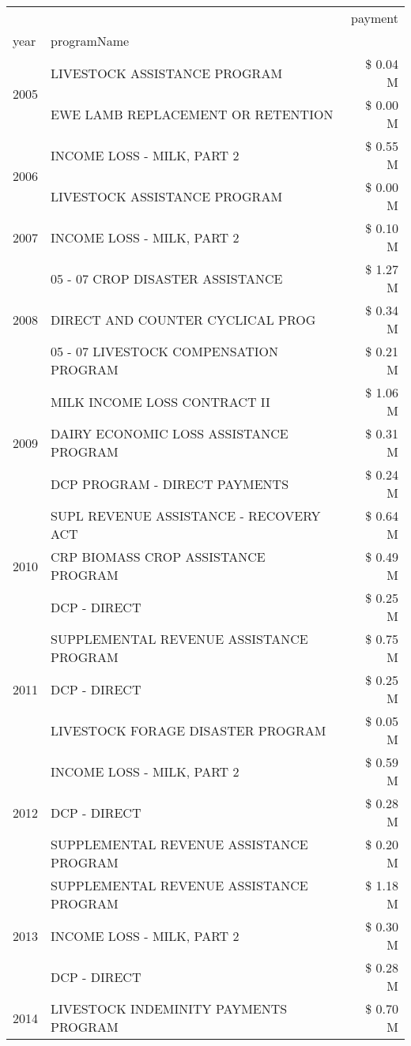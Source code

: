 \begin{tabular}{llr}
\toprule
 &  & payment \\
year & programName &  \\
\midrule
\multirow[t]{2}{*}{2005} & LIVESTOCK ASSISTANCE PROGRAM & \$ 0.04 M \\
 & EWE LAMB REPLACEMENT OR RETENTION & \$ 0.00 M \\
\cline{1-3}
\multirow[t]{2}{*}{2006} & INCOME LOSS - MILK, PART 2 & \$ 0.55 M \\
 & LIVESTOCK ASSISTANCE PROGRAM & \$ 0.00 M \\
\cline{1-3}
2007 & INCOME LOSS - MILK, PART 2 & \$ 0.10 M \\
\cline{1-3}
\multirow[t]{3}{*}{2008} & 05 - 07 CROP DISASTER ASSISTANCE & \$ 1.27 M \\
 & DIRECT AND COUNTER CYCLICAL PROG & \$ 0.34 M \\
 & 05 - 07 LIVESTOCK COMPENSATION PROGRAM & \$ 0.21 M \\
\cline{1-3}
\multirow[t]{3}{*}{2009} & MILK INCOME LOSS CONTRACT II & \$ 1.06 M \\
 & DAIRY ECONOMIC LOSS ASSISTANCE PROGRAM & \$ 0.31 M \\
 & DCP PROGRAM - DIRECT PAYMENTS & \$ 0.24 M \\
\cline{1-3}
\multirow[t]{3}{*}{2010} & SUPL REVENUE ASSISTANCE - RECOVERY ACT & \$ 0.64 M \\
 & CRP BIOMASS CROP ASSISTANCE PROGRAM & \$ 0.49 M \\
 & DCP - DIRECT & \$ 0.25 M \\
\cline{1-3}
\multirow[t]{3}{*}{2011} & SUPPLEMENTAL REVENUE ASSISTANCE PROGRAM & \$ 0.75 M \\
 & DCP - DIRECT & \$ 0.25 M \\
 & LIVESTOCK FORAGE DISASTER PROGRAM & \$ 0.05 M \\
\cline{1-3}
\multirow[t]{3}{*}{2012} & INCOME LOSS - MILK, PART 2 & \$ 0.59 M \\
 & DCP - DIRECT & \$ 0.28 M \\
 & SUPPLEMENTAL REVENUE ASSISTANCE PROGRAM & \$ 0.20 M \\
\cline{1-3}
\multirow[t]{3}{*}{2013} & SUPPLEMENTAL REVENUE ASSISTANCE PROGRAM & \$ 1.18 M \\
 & INCOME LOSS - MILK, PART 2 & \$ 0.30 M \\
 & DCP - DIRECT & \$ 0.28 M \\
\cline{1-3}
\multirow[t]{3}{*}{2014} & LIVESTOCK INDEMINITY PAYMENTS PROGRAM & \$ 0.70 M \\

\end{tabular}
